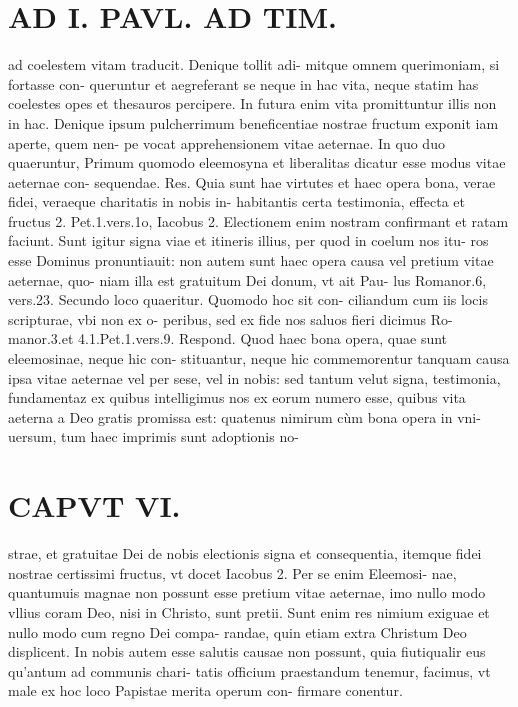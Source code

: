 \documentclass{article}
\begin{document}
\begin{pages}
\section*{AD I. PAVL. AD TIM. }
\marginpar{[ p.J00. ]}\pstart ad coelestem vitam traducit. Denique tollit adi- mitque omnem querimoniam, si fortasse con- queruntur et aegreferant se neque in hac vita, neque statim has coelestes opes et thesauros percipere. In futura enim vita promittuntur illis non in hac.  \pend\pstart Denique ipsum pulcherrimum beneficentiae nostrae fructum exponit iam aperte, quem nen- pe vocat apprehensionem vitae aeternae. In quo duo quaeruntur, Primum quomodo eleemosyna et liberalitas dicatur esse modus vitae aeternae con- sequendae. Res. Quia sunt hae virtutes et haec opera bona, verae fidei, veraeque charitatis in nobis in- habitantis certa testimonia, effecta et fructus 2. Pet.1.vers.1o, Iacobus 2. Electionem enim nostram confirmant et ratam faciunt. Sunt igitur signa viae et itineris illius, per quod in coelum nos itu- ros esse Dominus pronuntiauit: non autem sunt haec opera causa vel pretium vitae aeternae, quo- niam illa est gratuitum Dei donum, vt ait Pau- lus Romanor.6, vers.23.  \pend\pstart Secundo loco quaeritur. Quomodo hoc sit con- ciliandum cum iis locis scripturae, vbi non ex o- peribus, sed ex fide nos saluos fieri dicimus Ro- manor.3.et 4.1.Pet.1.vers.9. Respond. Quod haec bona opera, quae sunt eleemosinae, neque hic con- stituantur, neque hic commemorentur tanquam causa ipsa vitae aeternae vel per sese, vel in nobis: sed tantum velut signa, testimonia, fundamentaz ex quibus intelligimus nos ex eorum numero esse, quibus vita aeterna a Deo gratis promissa est: quatenus nimirum cùm bona opera in vni- uersum, tum haec imprimis sunt adoptionis no-  \pend
\section*{CAPVT  VI. }
\marginpar{[ p.]}\pstart strae, et gratuitae Dei de nobis electionis signa et consequentia, itemque fidei nostrae certissimi fructus, vt docet Iacobus 2. Per se enim Eleemosi- nae, quantumuis magnae non possunt esse pretium vitae aeternae, imo nullo modo vllius coram Deo, nisi in Christo, sunt pretii. Sunt enim res nimium exiguae et nullo modo cum regno Dei compa- randae, quin etiam extra Christum Deo displicent. In nobis autem esse salutis causae non possunt, quia fiutiqualir eus qu'antum ad communis chari- tatis officium praestandum tenemur, facimus, vt male ex hoc loco Papistae merita operum con- firmare conentur.  \pend
{}
{}

\end{pages}
\end{document}
